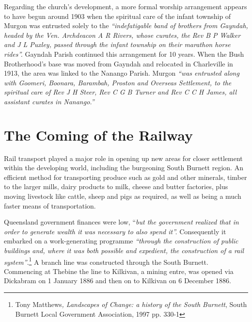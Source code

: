 Regarding the church's development, a more formal worship arrangement appears to have begun around 1903 when the spiritual care of the infant township of Murgon was entrusted solely to the \emph{``indefatigable band of brothers from Gayndah, headed by the Ven. Archdeacon A R Rivers, whose curates, the Rev B P Walker and J L Puxley, passed through the infant township on their marathon horse rides''.} Gayndah Parish continued this arrangement for 10 years. When the Bush Brotherhood's base was moved from Gayndah and relocated in Charleville in 1913, the area was linked to the Nanango Parish. Murgon \emph{``was entrusted along with Goomeri, Boonara, Barambah, Proston and Overseas Settlement, to the spiritual care of Rev J H Steer, Rev C G B Turner and Rev C C H James, all assistant curates in Nanango.''}



\section{The Coming of the Railway}



Rail transport played a major role in opening up new areas for closer settlement within the developing world, including the burgeoning South Burnett region. An efficient method for transporting produce such as gold and other minerals, timber to the larger mills, dairy products to milk, cheese and butter factories, plus moving livestock like cattle, sheep and pigs as required, as well as being a much faster means of transportation.



Queensland government finances were low, ``\emph{but the government realized that in order to generate wealth it was necessary to also spend it''.} Consequently it embarked on a work-generating programme \emph{``through the construction of public buildings and, where it was both possible and expedient, the construction of a rail system''}.\footnote{Tony Matthews\emph{, Landscapes of Change: a history of the South Burnett}, South Burnett Local Government Association, 1997 pp. 330-1} A branch line was constructed through the South Burnett. Commencing at Thebine the line to Kilkivan, a mining entre, was opened via Dickabram on 1 January 1886 and then on to Kilkivan on 6 December 1886.


